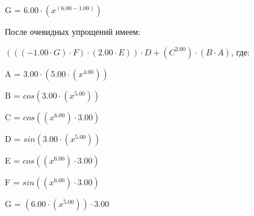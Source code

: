 \documentclass{article}
\begin{document}
\qquad G = $6.00 \cdot ({x}^{(6.00 - 1.00)})$



\bigskip После очевидных упрощений имеем:

$(((-1.00 \cdot G) \cdot F) \cdot (2.00 \cdot E)) \cdot D + ({C}^{2.00}) \cdot (B \cdot A)$, где:

\bigskip\qquad A = $3.00 \cdot (5.00 \cdot ({x}^{4.00}))$

\qquad B = $cos(3.00 \cdot ({x}^{5.00}))$

\qquad C = $cos(({x}^{6.00}) \cdot 3.00)$

\qquad D = $sin(3.00 \cdot ({x}^{5.00}))$

\qquad E = $cos(({x}^{6.00}) \cdot 3.00)$

\qquad F = $sin(({x}^{6.00}) \cdot 3.00)$

\qquad G = $(6.00 \cdot ({x}^{5.00})) \cdot 3.00$
\end{document}
